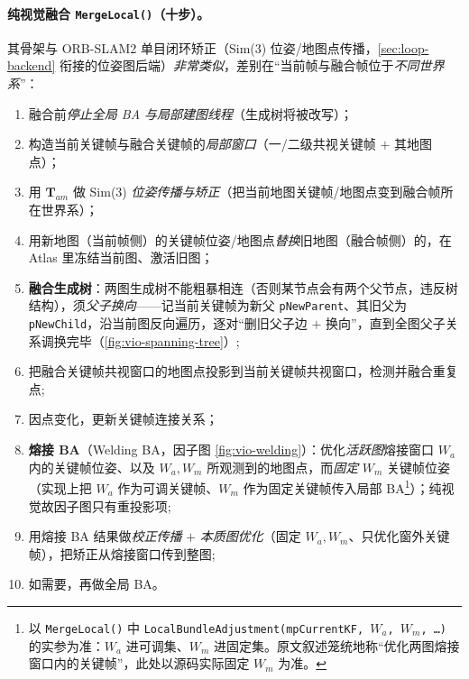 \paragraph{纯视觉融合 \texttt{MergeLocal()}（十步）。}
其骨架与 ORB-SLAM2 单目闭环矫正（Sim(3) 位姿/地图点传播，\cref{sec:loop-backend} 衔接的位姿图后端）\emph{非常类似}，差别在“当前帧与融合帧位于\emph{不同世界系}”\cite{campos2021orbslam3}：
\begin{enumerate}
  \item 融合前\emph{停止全局 BA 与局部建图线程}（生成树将被改写）；
  \item 构造当前关键帧与融合关键帧的\emph{局部窗口}（一/二级共视关键帧 $+$ 其地图点）；
  \item 用 $\mathbf{T}_{am}$ 做 Sim(3) \emph{位姿传播与矫正}（把当前地图关键帧/地图点变到融合帧所在世界系）；
  \item 用新地图（当前帧侧）的关键帧位姿/地图点\emph{替换}旧地图（融合帧侧）的，在 Atlas 里冻结当前图、激活旧图；
  \item \textbf{融合生成树}：两图生成树不能粗暴相连（否则某节点会有两个父节点，违反树结构），须\emph{父子换向}——记当前关键帧为新父 \texttt{pNewParent}、其旧父为 \texttt{pNewChild}，沿当前图反向遍历，逐对“删旧父子边 $+$ 换向”，直到全图父子关系调换完毕（\cref{fig:vio-spanning-tree}）;
  \item 把融合关键帧共视窗口的地图点投影到当前关键帧共视窗口，检测并融合重复点;
  \item 因点变化，更新关键帧连接关系；
  \item \textbf{熔接 BA}（Welding BA，因子图 \cref{fig:vio-welding}）：优化\emph{活跃图}熔接窗口 $W_a$ 内的关键帧位姿、以及 $W_a,W_m$ 所观测到的地图点，而\emph{固定} $W_m$ 关键帧位姿（实现上把 $W_a$ 作为可调关键帧、$W_m$ 作为固定关键帧传入局部 BA\footnote{以 \texttt{MergeLocal()} 中 \texttt{LocalBundleAdjustment(mpCurrentKF, $W_a$, $W_m$, \dots)} 的实参为准：$W_a$ 进可调集、$W_m$ 进固定集。原文叙述笼统地称“优化两图熔接窗口内的关键帧”，此处以源码实际固定 $W_m$ 为准。}）；纯视觉故因子图只有重投影项;
  \item 用熔接 BA 结果做\emph{校正传播} $+$ \emph{本质图优化}（固定 $W_a,W_m$、只优化窗外关键帧），把矫正从熔接窗口传到整图;
  \item 如需要，再做全局 BA。
\end{enumerate}

